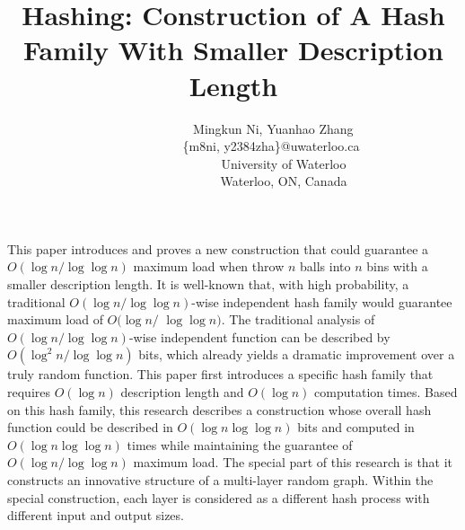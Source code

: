 \documentclass[a4paper, english]{paper}
\renewenvironment{abstract}
 {
  \begin{center}
  \bfseries \abstractname\vspace{-.5em}\vspace{0pt}
  \end{center}
  \list{}{
    \setlength{\leftmargin}{1cm}%
    \setlength{\rightmargin}{\leftmargin}%
  }%
  \item\relax}
 {\endlist}
\begin{document}
\selectfont

	\title{Hashing: Construction of A Hash Family With Smaller Description Length}
	\author{$\qquad$$\qquad$$\qquad$ Mingkun Ni, Yuanhao Zhang\\
		$\qquad$$\qquad$$\qquad$\{m8ni, y2384zha\}@uwaterloo.ca\\
		 $\qquad$$\qquad$$\qquad$$\qquad$University of Waterloo\\
		$\qquad$$\qquad$$\qquad$$\qquad$Waterloo, ON, Canada\\
	}
	\maketitle
	
	\vspace{0.3cm}
	\begin{abstract}
	This paper introduces and proves a new construction that could guarantee a $O(\log n/\log\log n)$ maximum load when throw $n$ balls into $n$ bins with a smaller description length. It is well-known that, with high probability, a traditional $O(\log n/\log\log n)$-wise independent hash family would guarantee maximum load of $O(\log n/$ $\log\log n)$. The traditional analysis of $O(\log n/\log\log n)$-wise independent function can be described by $O(\log^2 n/\log\log n)$ bits, which already yields a dramatic improvement over a truly random function. This paper first introduces a specific hash family that requires $O(\log n)$ description length and $O(\log n)$ computation times. Based on this hash family, this research describes a construction whose overall hash function could be described in $O(\log n \log\log n)$ bits and computed in $O(\log n \log\log n)$ times while maintaining the guarantee of $O(\log n/\log\log n)$ maximum load. The special part of this research is that it constructs an innovative structure of a multi-layer random graph. Within the special construction, each layer is considered as a different hash process with different input and output sizes.
	\end{abstract}
	\vspace{0.3cm}
\end{document}
